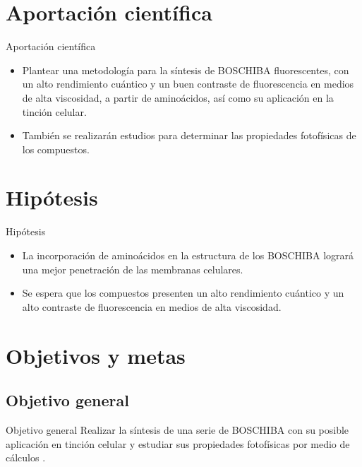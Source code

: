 \documentclass[%
spanish,
mexico]{beamer}
\begin{document}
\section{Aportación científica}
\begin{frame}{Aportación científica}
    \begin{itemize}[<+- | alert@+>]
        \item Plantear una metodología para la síntesis de \gls{BOSCHIBA} fluorescentes, con un alto rendimiento cuántico y un buen contraste de fluorescencia en medios de alta viscosidad, a partir de aminoácidos, así como su aplicación en la tinción celular.
        \item También se realizarán estudios \insilico{} para determinar las propiedades fotofísicas de los compuestos.
    \end{itemize}
\end{frame}

\section{Hipótesis}
\begin{frame}{Hipótesis}
    \begin{itemize}[<+- | alert@+>]
        \item La incorporación de aminoácidos en la estructura de los \gls{BOSCHIBA} logrará una mejor penetración de las membranas celulares.
        \item Se espera que los compuestos presenten un alto rendimiento cuántico y un alto contraste de fluorescencia en medios de alta viscosidad.
    \end{itemize}
\end{frame}

\section{Objetivos y metas}
\subsection{Objetivo general}
\begin{frame}{Objetivo general}
    Realizar la síntesis de una serie de \gls{BOSCHIBA} con su posible aplicación en tinción celular y estudiar sus propiedades fotofísicas por medio de cálculos \insilico{}.
\end{frame}
\end{document}
